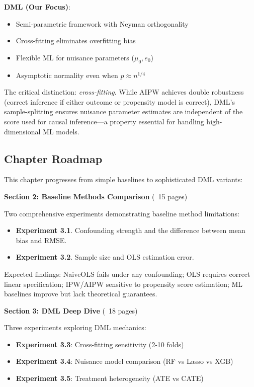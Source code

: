 \textbf{DML (Our Focus)}:
\begin{itemize}
    \item Semi-parametric framework with Neyman orthogonality
    \item Cross-fitting eliminates overfitting bias
    \item Flexible ML for nuisance parameters ($\mu_0, e_0$)
    \item Asymptotic normality even when $p \approx n^{1/4}$
\end{itemize}

The critical distinction: \textit{cross-fitting}. While AIPW achieves double robustness (correct inference if either outcome or propensity model is correct), DML's sample-splitting ensures nuisance parameter estimates are independent of the score used for causal inference---a property essential for handling high-dimensional ML models.

\subsection{Chapter Roadmap}

This chapter progresses from simple baselines to sophisticated DML variants:

\textbf{Section 2: Baseline Methods Comparison} (~15 pages)

Two comprehensive experiments demonstrating baseline method limitations:
\begin{itemize}
    \item \textbf{Experiment 3.1}. Confounding strength and the difference between mean bias and RMSE.
    \item \textbf{Experiment 3.2}. Sample size and OLS estimation error.
\end{itemize}

Expected findings: NaiveOLS fails under any confounding; OLS requires correct linear specification; IPW/AIPW sensitive to propensity score estimation; ML baselines improve but lack theoretical guarantees.

\textbf{Section 3: DML Deep Dive} (~18 pages)

Three experiments exploring DML mechanics:
\begin{itemize}
    \item \textbf{Experiment 3.3}: Cross-fitting sensitivity (2-10 folds)
    \item \textbf{Experiment 3.4}: Nuisance model comparison (RF vs Lasso vs XGB)
    \item \textbf{Experiment 3.5}: Treatment heterogeneity (ATE vs CATE)
\end{itemize}

